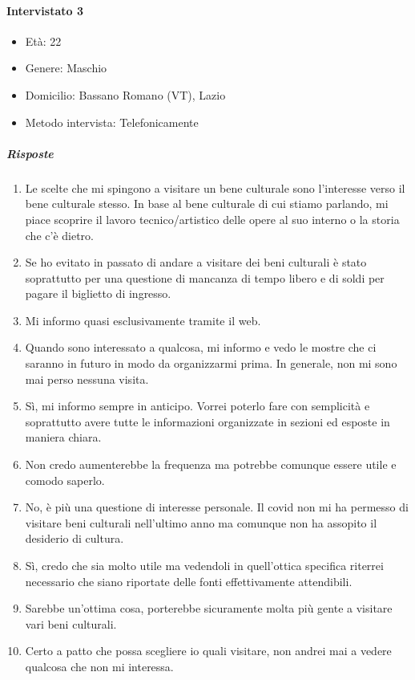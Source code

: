 \documentclass{article}
\begin{document}
\paragraph{Intervistato 3}
\begin{itemize}
\item Età: 22
\item Genere: Maschio
\item Domicilio: Bassano Romano (VT), Lazio
\item Metodo intervista: Telefonicamente
\end{itemize}
\subparagraph{Risposte}
\begin{enumerate}
\item Le scelte che mi spingono a visitare un bene culturale sono l’interesse verso il bene culturale stesso. In base al bene culturale di cui stiamo parlando, mi piace scoprire il lavoro tecnico/artistico delle opere al suo interno o la storia che c’è dietro.
\item Se ho evitato in passato di andare a visitare dei beni culturali è stato soprattutto per una questione di mancanza di tempo libero e di soldi per pagare il biglietto di ingresso.
\item Mi informo quasi esclusivamente tramite il web.
\item Quando sono interessato a qualcosa, mi informo e vedo le mostre che ci saranno in futuro in modo da organizzarmi prima. In generale, non mi sono mai perso nessuna visita.
\item Sì, mi informo sempre in anticipo. Vorrei poterlo fare con semplicità e soprattutto avere tutte le informazioni organizzate in sezioni ed esposte in maniera chiara.
\item Non credo aumenterebbe la frequenza ma potrebbe comunque essere utile e comodo saperlo.
\item No, è più una questione di interesse personale. Il covid non mi ha permesso di visitare beni culturali nell’ultimo anno ma comunque non ha assopito il desiderio di cultura.
\item Sì, credo che sia molto utile ma vedendoli in quell’ottica specifica riterrei necessario che siano riportate delle fonti effettivamente attendibili.
\item Sarebbe un’ottima cosa, porterebbe sicuramente molta più gente a visitare vari beni culturali.
\item Certo a patto che possa scegliere io quali visitare, non andrei mai a vedere qualcosa che non mi interessa.
\end{enumerate}
\end{document}
